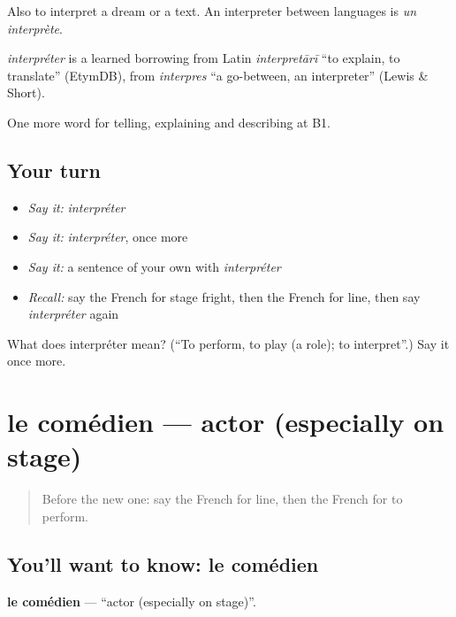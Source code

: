 Also to interpret a dream or a text. An interpreter between languages is \emph{un interprète}.

\begin{cousinweb}
\emph{interpréter} is a learned borrowing from Latin \emph{interpretārī} \textquotedblleft{}to explain, to translate\textquotedblright{} (EtymDB), from \emph{interpres} \textquotedblleft{}a go-between, an interpreter\textquotedblright{} (Lewis \& Short).
\end{cousinweb}

\begin{grammarlens}[title={What you've built}]
One more word for telling, explaining and describing at B1.
\end{grammarlens}

\subsection*{Your turn}
\begin{itemize}
\raggedright
  \item \emph{Say it:} \emph{interpréter}
  \item \emph{Say it:} \emph{interpréter}, once more
  \item \emph{Say it:} a sentence of your own with \emph{interpréter}
  \item \emph{Recall:} say the French for stage fright, then the French for line, then say \emph{interpréter} again
\end{itemize}

\begin{tcolorbox}[breakable,colback=teal!4,colframe=teal!35!black,title={Before you move on}]
What does interpréter mean? (\textquotedblleft{}To perform, to play (a role); to interpret\textquotedblright{}.) Say it once more.
\end{tcolorbox}
\section[le comédien]{le comédien — actor (especially on stage)}

\label{lesson:FR-C515-comedien}



\begin{quote}
Before the new one: say the French for line, then the French for to perform.
\end{quote}

\subsection*{You'll want to know: le comédien}
\textbf{le comédien} — \textquotedblleft{}actor (especially on stage)\textquotedblright{}.

